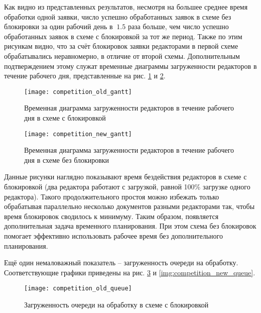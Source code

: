 \vspace{\baselineskip}
Как видно из представленных результатов, несмотря на б\textit{о}льшее среднее время обработки одной заявки, число успешно обработанных заявок в схеме без блокировки за один рабочий день в $~1.5$ раза больше, чем число успешно обработанных заявок в схеме с блокировкой за тот же период. Также по этим рисункам видно, что за счёт блокировок заявки редакторами в первой схеме обрабатывались неравномерно, в отличие от второй схемы. Дополнительным подтверждением этому служат временные диаграммы загруженности редакторов в течение рабочего дня, представленные на рис. \ref{img:competition_old_gantt} и \ref{img:competition_new_gantt}.

\begin{figure}[h!]
  \centering
  \texttt{[image: competition\_old\_gantt]}
  \caption{Временная диаграмма загруженности редакторов в течение рабочего дня в схеме с блокировкой}
  \label{img:competition_old_gantt}
\end{figure}

\begin{figure}[h!]
  \centering
  \texttt{[image: competition\_new\_gantt]}
  \caption{Временная диаграмма загруженности редакторов в течение рабочего дня в схеме без блокировки}
  \label{img:competition_new_gantt}
\end{figure}

\vspace{\baselineskip}
Данные рисунки наглядно показывают время бездействия редакторов в схеме с блокировкой (два редактора работают с загрузкой, равной 100\% загрузке одного редактора). Такого продолжительного простоя можно избежать только обрабатывая параллельно несколько документов разными редакторами так, чтобы время блокировок сводилось к минимуму. Таким образом, появляется дополнительная задача временн\textit{о}го планирования. При этом схема без блокировок помогает эффективно использовать рабочее время без дополнительного планирования.

\vspace{\baselineskip}
Ещё один немаловажный показатель -- загруженность очереди на обработку. Соответствующие графики приведены на рис. \ref{img:competition_old_queue} и \ref{img:competition_new_queue}.

\begin{figure}[h!]
  \centering
  \texttt{[image: competition\_old\_queue]}
  \caption{Загруженность очереди на обработку в схеме с блокировкой}
  \label{img:competition_old_queue}
\end{figure}

